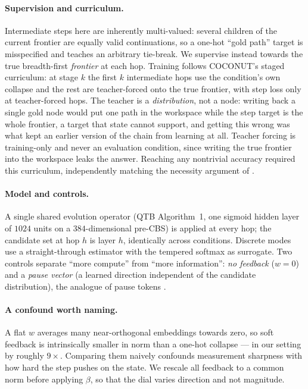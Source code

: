 \documentclass[11pt]{article}
\theoremstyle{definition}
\begin{document}
\paragraph{Supervision and curriculum.} Intermediate steps here are inherently
multi-valued: several children of the current frontier are equally valid
continuations, so a one-hot ``gold path'' target is misspecified and teaches an
arbitrary tie-break. We supervise instead towards the true breadth-first
\emph{frontier} at each hop. Training follows COCONUT's staged curriculum: at stage
$k$ the first $k$ intermediate hops use the condition's own collapse and the rest are
teacher-forced onto the true frontier, with step loss only at teacher-forced hops.
The teacher is a \emph{distribution}, not a node: writing back a single gold node
would put one path in the workspace while the step target is the whole frontier, a
target that state cannot support, and getting this wrong was what kept an earlier
version of the chain from learning at all. Teacher forcing is training-only and never
an evaluation condition, since writing the true frontier into the workspace leaks the
answer. Reaching any nontrivial accuracy required this curriculum, independently
matching the necessity argument of \citet{zou2026limits}.

\paragraph{Model and controls.} A single shared evolution operator (QTB
Algorithm~1, one sigmoid hidden layer of $1024$ units on a $384$-dimensional
pre-CBS) is applied at every hop; the candidate set at hop $h$ is layer $h$,
identically across conditions. Discrete modes use a straight-through estimator
\citep{bengio2013estimating,jang2017gumbel} with the tempered softmax as surrogate.
Two controls separate ``more compute'' from ``more information'': \emph{no feedback}
($w=0$) and a \emph{pause vector} (a learned direction independent of the candidate
distribution), the analogue of pause tokens \citep{goyal2023pause}.

\paragraph{A confound worth naming.} A flat $w$ averages many near-orthogonal
embeddings towards zero, so soft feedback is intrinsically smaller in norm than a
one-hot collapse --- in our setting by roughly $9\times$. Comparing them naively
confounds measurement sharpness with how hard the step pushes on the state. We
rescale all feedback to a common norm before applying $\beta$, so that the dial
varies direction and not magnitude.
\end{document}
